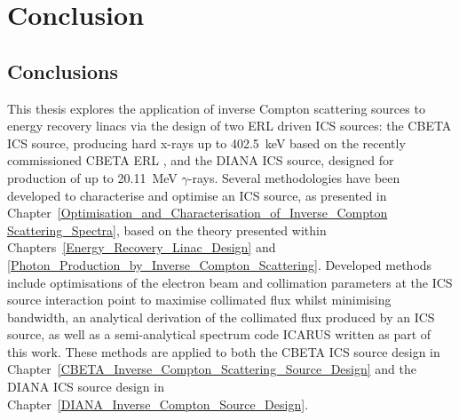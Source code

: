 \documentclass[../main.tex]{subfiles}
\begin{document}
\chapter{Conclusion}
\label{Conclusion} %

\section{Conclusions}

This thesis explores the application of inverse Compton scattering sources to energy recovery linacs via the design of two ERL driven ICS sources: the CBETA ICS source, producing hard x-rays up to 402.5~\si{\kilo\electronvolt} based on the recently commissioned CBETA ERL \cite{bartnik2020cbeta}, and the DIANA ICS source, designed for production of up to 20.11~\si{\mega\electronvolt} $\gamma$-rays. Several methodologies have been developed to characterise and optimise an ICS source, as presented in Chapter~\ref{Optimisation_and_Characterisation_of_Inverse_Compton Scattering_Spectra}, based on the theory presented within Chapters~\ref{Energy_Recovery_Linac_Design} and \ref{Photon_Production_by_Inverse_Compton_Scattering}. Developed methods include optimisations of the electron beam and collimation parameters at the ICS source interaction point to maximise collimated flux whilst minimising bandwidth, an analytical derivation of the collimated flux produced by an ICS source, as well as a semi-analytical spectrum code \textsc{ICARUS} written as part of this work. These methods are applied to both the CBETA ICS source design in Chapter~\ref{CBETA_Inverse_Compton_Scattering_Source_Design} and the DIANA ICS source design in Chapter~\ref{DIANA_Inverse_Compton_Source_Design}.
\end{document}
